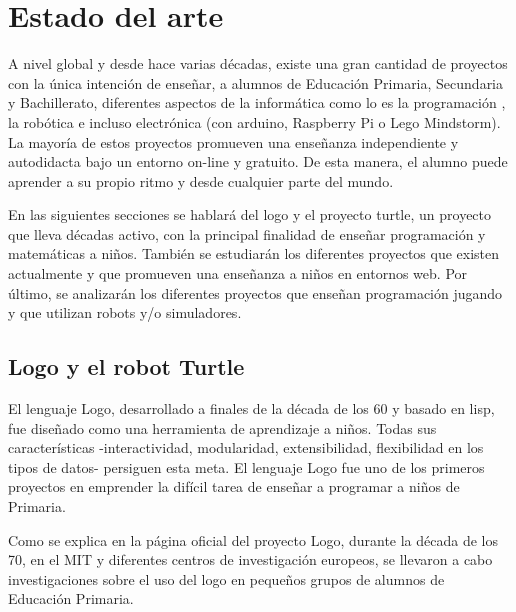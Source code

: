 \chapter{Estado del arte}\label{estado-arte}



A nivel global y desde hace varias décadas, existe una gran cantidad de proyectos con la única intención de enseñar, a alumnos de Educación Primaria, Secundaria y Bachillerato, diferentes aspectos de la informática como lo es la programación \cite{code-school,code-org,code-academy}, la robótica \cite{robomind-web,moway} e incluso electrónica (con \Gls{arduino}\cite{arduino}, Raspberry Pi\cite{raspberry-pi} o Lego Mindstorm\cite{lego-mindstorm-programar}).
La mayoría de estos proyectos promueven una enseñanza independiente y autodidacta bajo un entorno on-line y gratuito. De esta manera, el alumno puede aprender a su propio ritmo y desde cualquier parte del mundo.

En las siguientes secciones se hablará del \Gls{logo}\cite{logo} y el proyecto \Gls{turtle}\cite{logo-turtle}, un proyecto que lleva décadas activo, con la principal finalidad de enseñar programación y matemáticas a niños. También se estudiarán los diferentes proyectos que existen actualmente y que promueven una enseñanza a niños en entornos web. Por último, se analizarán los diferentes proyectos que enseñan programación jugando y que utilizan robots y/o simuladores.


\section{Logo y el robot Turtle}
\label{sec:Logo}

El lenguaje Logo, desarrollado a finales de la década de los 60 y basado en \Gls{lisp}, fue diseñado como una herramienta de aprendizaje a niños. Todas sus características -interactividad, modularidad, extensibilidad, flexibilidad en los tipos de datos- persiguen esta meta. El lenguaje Logo fue uno de los primeros proyectos en emprender la difícil tarea de enseñar a programar a niños de Primaria.


Como se explica en la página oficial del proyecto Logo\cite{logo}, durante la década de los 70, en el \acrfull{MIT} y diferentes centros de investigación europeos, se llevaron a cabo investigaciones sobre el uso del \Gls{logo} en pequeños grupos de alumnos de Educación Primaria.

